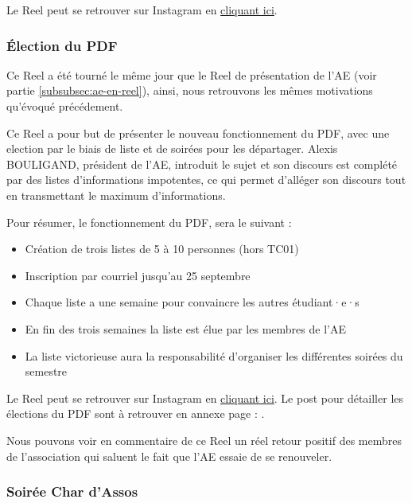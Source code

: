 Le Reel peut se retrouver sur Instagram en \href{https://www.instagram.com/reel/CxGShAusxDq/?utm_source=ig_web_copy_link&igshid=MzRlODBiNWFlZA==}{cliquant ici}.


\subsubsection{Élection du \gls{PDF}}\label{subsubsec:election-pdf}


Ce Reel a été tourné le même jour que le Reel de présentation de l'AE (voir partie \ref{subsubsec:ae-en-reel}), ainsi, nous retrouvons les mêmes motivations qu'évoqué précédement.

Ce Reel a pour but de présenter le nouveau fonctionnement du \gls{PDF}, avec une election par le biais de liste et de soirées pour les départager.
Alexis BOULIGAND, président de l'\gls{AE}, introduit le sujet et son discours est complété par des listes d'informations impotentes, ce qui permet d'alléger son discours tout en transmettant le maximum d'informations.

Pour résumer, le fonctionnement du \gls{PDF}, sera le suivant :
\begin{itemize}
    \item Création de trois listes de 5 à 10 personnes (hors TC01)
    \item Inscription par courriel jusqu'au 25 septembre
    \item Chaque liste a une semaine pour convaincre les autres étudiant·e·s
    \item En fin des trois semaines la liste est élue par les membres de l'\gls{AE}
    \item La liste victorieuse aura la responsabilité d'organiser les différentes soirées du semestre
\end{itemize}

Le Reel peut se retrouver sur Instagram en \href{https://www.instagram.com/reel/CxQtgEXMqon/?utm_source=ig_web_copy_link&igshid=MzRlODBiNWFlZA==}{cliquant ici}.
Le post pour détailler les élections du \gls{PDF} sont à retrouver en annexe page : \pageref{subsec:interface-instagram}.

Nous pouvons voir en commentaire de ce Reel un réel retour positif des membres de l'association qui saluent le fait que l'\gls{AE} essaie de se renouveler.

\subsubsection{Soirée Char d'Assos}

